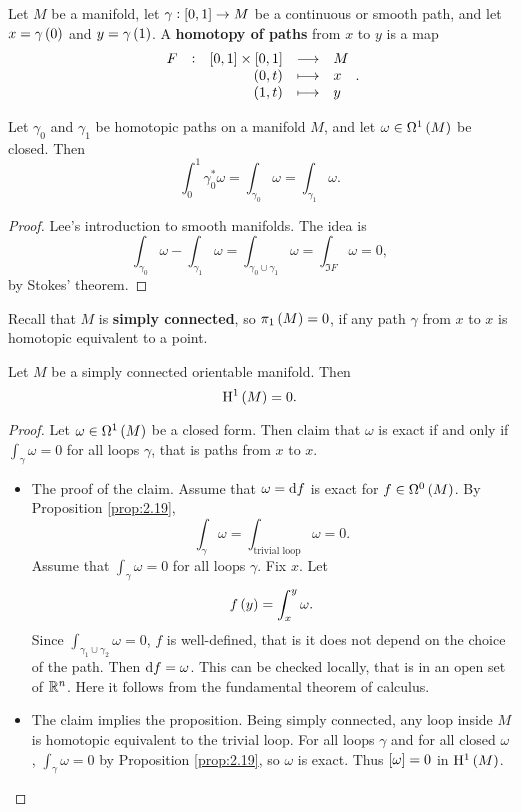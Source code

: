\begin{definition}
Let $ M $ be a manifold, let $ \gamma : \sbr{0, 1} \to M $ be a continuous or smooth path, and let $ x = \gamma\br{0} $ and $ y = \gamma\br{1} $. A \textbf{homotopy of paths} from $ x $ to $ y $ is a map
$$ \functions[F]{\sbr{0, 1} \times \sbr{0, 1}}{M}{\br{0, t}}{x}{\br{1, t}}{y}. $$
\end{definition}

\begin{proposition}
\label{prop:2.19}
Let $ \gamma_0 $ and $ \gamma_1 $ be homotopic paths on a manifold $ M $, and let $ \omega \in \Omega^1\br{M} $ be closed. Then
$$ \int_0^1 \gamma_0^*\omega = \int_{\gamma_0} \omega = \int_{\gamma_1} \omega. $$
\end{proposition}

\begin{proof}
Lee's introduction to smooth manifolds. The idea is
$$ \int_{\gamma_0} \omega - \int_{\gamma_1} \omega = \int_{\gamma_0 \cup \gamma_1} \omega = \int_{\Im F} \omega = 0, $$
by Stokes' theorem.
\end{proof}

Recall that $ M $ is \textbf{simply connected}, so $ \pi_1\br{M} = 0 $, if any path $ \gamma $ from $ x $ to $ x $ is homotopic equivalent to a point.

\begin{proposition}
Let $ M $ be a simply connected orientable manifold. Then
$$ \H^1\br{M} = 0. $$
\end{proposition}

\begin{proof}
Let $ \omega \in \Omega^1\br{M} $ be a closed form. Then claim that $ \omega $ is exact if and only if $ \int_\gamma \omega = 0 $ for all loops $ \gamma $, that is paths from $ x $ to $ x $.
\begin{itemize}
\item The proof of the claim. Assume that $ \omega = \mathrm{d} f $ is exact for $ f \in \Omega^0\br{M} $. By Proposition \ref{prop:2.19},
$$ \int_\gamma \omega = \int_{\text{trivial loop}} \omega = 0. $$
Assume that $ \int_\gamma \omega = 0 $ for all loops $ \gamma $. Fix $ x $. Let
$$ f\br{y} = \int_x^y \omega. $$
Since $ \int_{\gamma_1 \cup \gamma_2} \omega = 0 $, $ f $ is well-defined, that is it does not depend on the choice of the path. Then $ \mathrm{d} f = \omega $. This can be checked locally, that is in an open set of $ \mathbb{R}^n $. Here it follows from the fundamental theorem of calculus.
\item The claim implies the proposition. Being simply connected, any loop inside $ M $ is homotopic equivalent to the trivial loop. For all loops $ \gamma $ and for all closed $ \omega $, $ \int_\gamma \omega = 0 $ by Proposition \ref{prop:2.19}, so $ \omega $ is exact. Thus $ \sbr{\omega} = 0 $ in $ \H^1\br{M} $.
\end{itemize}
\end{proof}

